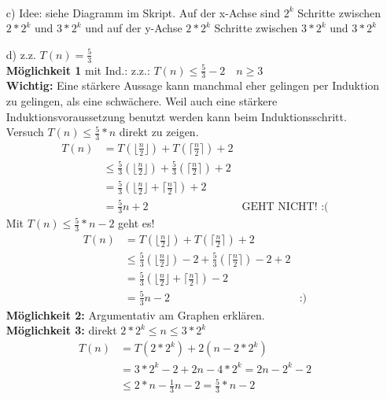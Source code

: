 \documentclass[ngerman,a4paper]{report}
\begin{document}
\begin{enumerate}
\begin{align*}
\end{align*}
\item[c)] Idee: siehe Diagramm im Skript. Auf der x-Achse sind $2^k$ Schritte zwischen $2*2^k$ und $3*2^k$ und auf der y-Achse $2*2^k$ Schritte zwischen $3*2^k$ und $3*2^k$\\
\item[d)] z.z. $T(n) = \frac{5}{3}$\\
\textbf{Möglichkeit 1} mit Ind.: z.z.: $T(n) \leq \frac{5}{3} - 2 \quad n \geq 3$\\
\textbf{Wichtig: }Eine stärkere Aussage kann manchmal eher gelingen per Induktion zu gelingen, als eine schwächere. Weil auch eine stärkere Induktionsvoraussetzung benutzt werden kann beim Induktionsschritt.\\
Versuch $T(n) \leq \frac{5}{3} * n$ direkt zu zeigen.\\
\begin{align*}
T(n) &= T(\lfloor\frac{n}{2}\rfloor) + T(\lceil \frac{n}{2} \rceil) +2\\
&\leq \frac{5}{3} (\lfloor\frac{n}{2}\rfloor) + \frac{5}{3}(\lceil \frac{n}{2} \rceil) +2\\
&= \frac{5}{3} (\lfloor\frac{n}{2}\rfloor + \lceil \frac{n}{2} \rceil) + 2\\
&= \frac{5}{3} n+2 &\text{GEHT NICHT! :(}
\end{align*}
Mit $T(n) \leq \frac{5}{3} * n -2$ geht es!
\begin{align*}
T(n) &= T(\lfloor\frac{n}{2}\rfloor) + T(\lceil \frac{n}{2} \rceil) +2\\
&\leq \frac{5}{3} (\lfloor\frac{n}{2}\rfloor)-2 + \frac{5}{3}(\lceil \frac{n}{2} \rceil)-2 +2\\
&= \frac{5}{3} (\lfloor\frac{n}{2}\rfloor + \lceil \frac{n}{2} \rceil) - 2\\
&= \frac{5}{3} n-2 &\text{:)}
\end{align*}
\textbf{Möglichkeit 2:} Argumentativ am Graphen erklären.\\
\textbf{Möglichkeit 3:} direkt $2*2^k \leq n \leq 3*2^k$
\begin{align*}
T(n) &= T(2*2^k) + 2(n-2*2^k)\\
&= 3*2^k-2+2n-4*2^k = 2n-2^k-2\\
&\leq 2*n -\frac{1}{3}n -2 = \frac{5}{3}*n-2\\
\end{align*}
\end{enumerate}
\end{document}
